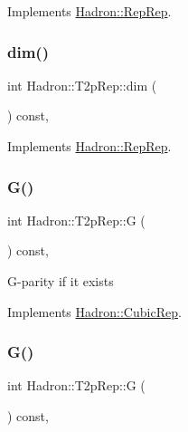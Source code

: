 Implements \mbox{\hyperlink{structHadron_1_1RepRep_a92c8802e5ed7afd7da43ccfd5b7cd92b}{Hadron\+::\+Rep\+Rep}}.

\mbox{\label{structHadron_1_1T2pRep_a7ececbae074c65b493f3bf73cf32c393}} 
\subsubsection{\texorpdfstring{dim()}{dim()}\hspace{0.1cm}{\footnotesize\ttfamily [3/3]}}
{\footnotesize\ttfamily int Hadron\+::\+T2p\+Rep\+::dim (\begin{DoxyParamCaption}{ }\end{DoxyParamCaption}) const\hspace{0.3cm}{\ttfamily [inline]}, {\ttfamily [virtual]}}



Implements \mbox{\hyperlink{structHadron_1_1RepRep_a92c8802e5ed7afd7da43ccfd5b7cd92b}{Hadron\+::\+Rep\+Rep}}.

\mbox{\label{structHadron_1_1T2pRep_a7feb263c3f7e0afe1c8beda96f62988e}} 
\subsubsection{\texorpdfstring{G()}{G()}\hspace{0.1cm}{\footnotesize\ttfamily [1/2]}}
{\footnotesize\ttfamily int Hadron\+::\+T2p\+Rep\+::G (\begin{DoxyParamCaption}{ }\end{DoxyParamCaption}) const\hspace{0.3cm}{\ttfamily [inline]}, {\ttfamily [virtual]}}

G-\/parity if it exists 

Implements \mbox{\hyperlink{structHadron_1_1CubicRep_a52104e43266d1614c00bbd1c3b395458}{Hadron\+::\+Cubic\+Rep}}.

\mbox{\label{structHadron_1_1T2pRep_a7feb263c3f7e0afe1c8beda96f62988e}} 
\subsubsection{\texorpdfstring{G()}{G()}\hspace{0.1cm}{\footnotesize\ttfamily [2/2]}}
{\footnotesize\ttfamily int Hadron\+::\+T2p\+Rep\+::G (\begin{DoxyParamCaption}{ }\end{DoxyParamCaption}) const\hspace{0.3cm}{\ttfamily [inline]}, {\ttfamily [virtual]}}

